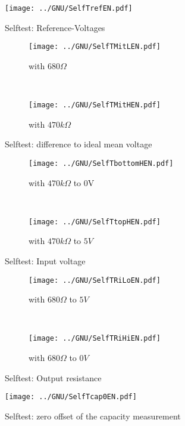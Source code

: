 \begin{figure}[H]
\centering
\texttt{[image: ../GNU/SelfTrefEN.pdf]}
\caption{Selftest: Reference-Voltages}
\label{fig:SelfTref}
\end{figure}


\begin{figure}[H]
  \begin{subfigure}[b]{.5\textwidth}
    \centering
    \texttt{[image: ../GNU/SelfTMitLEN.pdf]}
    \caption{with \(680\Omega\)}
    \label{fig:SelfTMitL}
  \end{subfigure}
  ~
  \begin{subfigure}[b]{.5\textwidth}
    \centering
    \texttt{[image: ../GNU/SelfTMitHEN.pdf]}
    \caption{with \(470k\Omega\)}
    \label{fig:SelfTMitH}
  \end{subfigure}
  \caption{Selftest: difference to ideal mean voltage}
\end{figure}

\begin{figure}[H]
  \begin{subfigure}[b]{.5\textwidth}
  \centering
    \texttt{[image: ../GNU/SelfTbottomHEN.pdf]}
    \caption{with \(470k\Omega\) to 0V}
    \label{fig:SelfTlowH}
  \end{subfigure}
  ~
  \begin{subfigure}[b]{.5\textwidth}
  \centering
    \texttt{[image: ../GNU/SelfTtopHEN.pdf]}
    \caption{with \(470k\Omega\) to \(5V\)}
    \label{fig:SelfTtopH}
  \end{subfigure}
  \caption{Selftest: Input voltage}
\end{figure}

\begin{figure}[H]
  \begin{subfigure}[b]{.5\textwidth}
  \centering
    \texttt{[image: ../GNU/SelfTRiLoEN.pdf]}
    \caption{with \(680\Omega\) to \(5V\)}
    \label{fig:SelfTRoL}
  \end{subfigure}
  ~
  \begin{subfigure}[b]{.5\textwidth}
  \centering
    \texttt{[image: ../GNU/SelfTRiHiEN.pdf]}
    \caption{with \(680\Omega\) to \(0V\)}
    \label{fig:SelfTRoH}
  \end{subfigure}
  \caption{Selftest: Output resistance}
\end{figure}

\begin{figure}[H]
  \centering
  \texttt{[image: ../GNU/SelfTcap0EN.pdf]}
  \caption{Selftest: zero offset of the capacity measurement}
  \label{fig:SelfTcap}
\end{figure}

